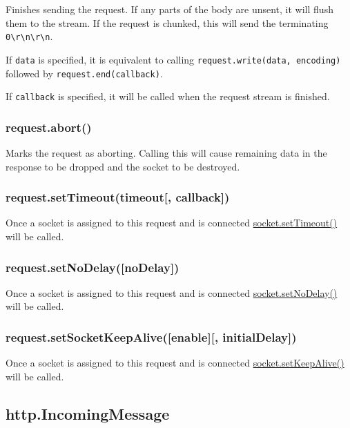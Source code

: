 Finishes sending the request. If any parts of the body are unsent, it
will flush them to the stream. If the request is chunked, this will send
the terminating
\texttt{\textquotesingle{}0\textbackslash{}r\textbackslash{}n\textbackslash{}r\textbackslash{}n\textquotesingle{}}.

If \texttt{data} is specified, it is equivalent to calling
\texttt{request.write(data,\ encoding)} followed by
\texttt{request.end(callback)}.

If \texttt{callback} is specified, it will be called when the request
stream is finished.

\subsubsection{request.abort()}\label{request.abort}

Marks the request as aborting. Calling this will cause remaining data in
the response to be dropped and the socket to be destroyed.

\subsubsection{request.setTimeout(timeout{[},
callback{]})}\label{request.settimeouttimeout-callback}

Once a socket is assigned to this request and is connected
\href{net.html\#net_socket_settimeout_timeout_callback}{socket.setTimeout()}
will be called.

\subsubsection{request.setNoDelay({[}noDelay{]})}\label{request.setnodelaynodelay}

Once a socket is assigned to this request and is connected
\href{net.html\#net_socket_setnodelay_nodelay}{socket.setNoDelay()} will
be called.

\subsubsection{request.setSocketKeepAlive({[}enable{]}{[},
initialDelay{]})}\label{request.setsocketkeepaliveenable-initialdelay}

Once a socket is assigned to this request and is connected
\href{net.html\#net_socket_setkeepalive_enable_initialdelay}{socket.setKeepAlive()}
will be called.

\subsection{http.IncomingMessage}\label{http.incomingmessage}

